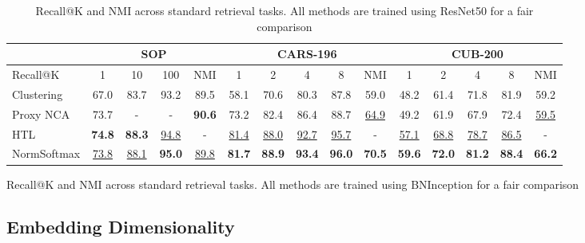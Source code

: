 \documentclass{bmvc2k}
\begin{document}
\begin{table*}
\begin{center}
{\begin{tabular}{l | c c c c  | c c c c c | c c c c c }
\hline
 &  \multicolumn{4}{c}{SOP} &  \multicolumn{5}{c}{CARS-196} &  \multicolumn{5}{c}{CUB-200} \\
\hline
Recall@K &  1 & 10 & 100  & NMI & 1 & 2 & 4 & 8 & NMI & 1 & 2 &4 & 8 & NMI \\
\hline\hline
Clustering~\cite{songCVPR17}  & 67.0 & 83.7& 93.2 & 89.5 & 58.1 & 70.6 & 80.3 & 87.8 &  59.0 & 48.2 & 61.4 & 71.8 & 81.9 & 59.2 \\
Proxy NCA\cite{nofusslearning}  &  73.7 & - & - & \textbf{90.6} & 73.2 & 82.4 & 86.4 & 88.7 & \underline{64.9} & 49.2 & 61.9 & 67.9 & 72.4 & \underline{59.5} \\
HTL~\cite{htl}  &  \textbf{74.8} & \textbf{88.3} & \underline{94.8} & - & \underline{81.4} & \underline{88.0} & \underline{92.7} & \underline{95.7} & - & \underline{57.1} & \underline{68.8} & \underline{78.7} & \underline{86.5} & - \\ 
\hline
NormSoftmax  & \underline{73.8} & \underline{88.1} & \textbf{95.0} & \underline{89.8} & \textbf{81.7} & \textbf{88.9} & \textbf{93.4} & \textbf{96.0} & \textbf{70.5} & \textbf{59.6} & \textbf{72.0} & \textbf{81.2} & \textbf{88.4} & \textbf{66.2} \\

\end{tabular}
}
\caption{Recall@K and NMI across standard retrieval tasks. All methods are trained using BNInception for a fair comparison}
\label{tab:bninception_loss}
\bigskip

\caption{Recall@K and NMI across standard retrieval tasks. All methods are trained using ResNet50 for a fair comparison}
\label{tab:resnet50_loss}
\end{center}
\end{table*} \subsection{Embedding Dimensionality}
\end{document}
